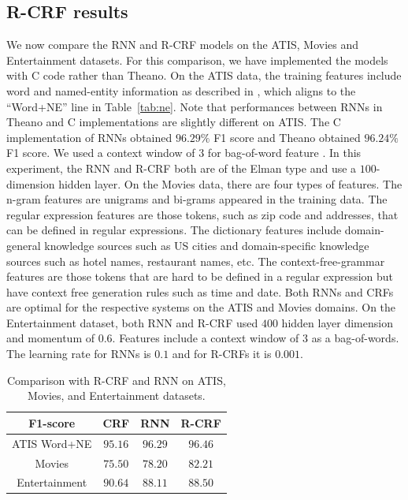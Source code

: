 \subsection{R-CRF results}

We now compare the RNN and R-CRF models on the ATIS, Movies and Entertainment
datasets. For this comparison, we have implemented the models with C code
rather than Theano. On the ATIS data, the training features include word and
named-entity information as described in \citep{rnn29}, which aligns to the “Word+NE”
line in Table~\ref{tab:ne}. Note that performances between RNNs in Theano and C
implementations are slightly different on ATIS. The C implementation of RNNs
obtained $96.29\%$ F1 score and Theano obtained $96.24\%$ F1 score. We used a
context window of $3$ for bag-of-word feature \citep{rnn24}. In this experiment, the RNN
and R-CRF both are of the Elman type and use a $100$-dimension hidden layer. On
the Movies data, there are four types of features. The n-gram features are
unigrams and bi-grams appeared in the training data. The regular expression
features are those tokens, such as zip code and addresses, that can be defined
in regular expressions. The dictionary features include domain-general
knowledge sources such as US cities and domain-specific knowledge sources such
as hotel names, restaurant names, etc. The context-free-grammar features are
those tokens that are hard to be defined in a regular expression but have
context free generation rules such as time and date. Both RNNs and CRFs are
optimal for the respective systems on the ATIS and Movies domains. On the
Entertainment dataset, both RNN and R-CRF used $400$ hidden layer dimension and
momentum of $0.6$. Features include a context window of $3$ as a bag-of-words. The
learning rate for RNNs is $0.1$ and for R-CRFs it is $0.001$. 

\begin{table}
\centering
\begin{tabular}{|c|c|c|c|}
\hline
F1-score  &  CRF & RNN & R-CRF\\
\hline
ATIS Word+NE  &  $95.16$ &  $96.29$ &  $96.46$ \\
Movies  & $75.50$   & $78.20$  &  $82.21$ \\
Entertainment &  $90.64$ &  $88.11$  & $88.50$ \\
\hline
\end{tabular}
\caption{Comparison with R-CRF and RNN on ATIS, Movies, and Entertainment datasets.}
\label{tab:rcrf}
\end{table}

